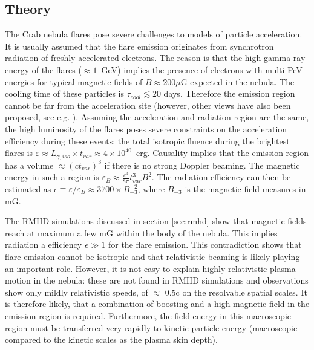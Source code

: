 \subsection{Theory}

The Crab nebula flares pose severe challenges to models of particle acceleration. It is usually assumed that the flare emission originates from synchrotron radiation of freshly accelerated electrons. The reason is that the high gamma-ray energy of the flares ($\approx 1$~GeV) implies the presence of electrons with multi PeV energies for typical magnetic fields of $B \approx 200 \mu$G expected in the nebula. The cooling time of these particles is $\tau_{cool} \lesssim 20$ days. Therefore the emission region cannot be far from the acceleration site  (however, other views have also been proposed, see e.g. \citet{Bykov_2012,2015arXiv151205426Z}). Assuming the acceleration and radiation region are the same, the high luminosity of the flares poses severe constraints on the acceleration efficiency during these events: the total isotropic fluence during the brightest flares is $\varepsilon \approx L_{\gamma,iso} \times t_{var} \approx 4 \times 10^{40} $~erg. Causality implies that the emission region has a volume $\approx (c t_{var})^3$ if there is no strong Doppler beaming. The magnetic energy in such a region is $\varepsilon_B \approx \frac{c^3}{8 \pi} t_{var}^3 B^2$. The radiation efficiency can then be estimated as $\epsilon \equiv \varepsilon / \varepsilon_B \approx  3700 \times B_{-3}^{-2}$, where $ B_{-3}$ is the magnetic field measures in mG.

The RMHD simulations discussed in section \ref{sec:rmhd} show that magnetic fields reach at maximum a few mG within the body of the nebula. This implies radiation a efficiency $\epsilon \gg 1$ for the flare emission. This contradiction shows that flare emission cannot be isotropic and that relativistic beaming is likely playing an important role. However, it is not easy to explain highly relativistic plasma motion in the nebula: these are not found in RMHD simulations and observations show only mildly relativistic speeds, of $\approx$ 0.5c on the resolvable spatial scales. It is therefore likely, that a combination of boosting and a high magnetic field in the emission region is required. Furthermore, the field energy in this macroscopic region must be transferred very rapidly to kinetic particle energy (macroscopic compared to the kinetic scales as the plasma skin depth). 

